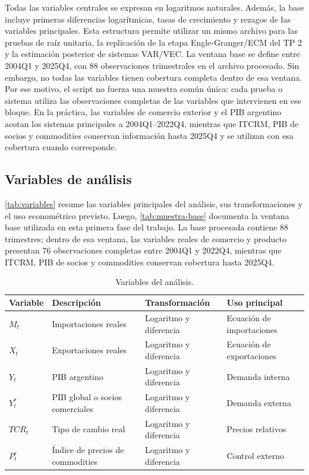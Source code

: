 \documentclass[11pt,a4paper]{article}
\begin{document}
	Todas las variables centrales se expresan en logaritmos naturales. Además, la
	base incluye primeras diferencias logarítmicas, tasas de crecimiento y rezagos
	de las variables principales. Esta estructura permite utilizar un mismo archivo
	para las pruebas de raíz unitaria, la replicación de la etapa Engle-Granger/ECM
	del TP 2 y la estimación posterior de sistemas VAR/VEC. La ventana base se
	define entre 2004Q1 y 2025Q4, con 88 observaciones trimestrales en el archivo
	procesado. Sin embargo, no todas las variables tienen cobertura completa dentro
	de esa ventana. Por ese motivo, el script no fuerza una muestra común única:
	cada prueba o sistema utiliza las observaciones completas de las variables que
	intervienen en ese bloque. En la práctica, las variables de comercio exterior y
	el PIB argentino acotan los sistemas principales a 2004Q1--2022Q4, mientras que
	ITCRM, PIB de socios y commodities conservan información hasta 2025Q4 y se
	utilizan con esa cobertura cuando corresponde.

	\subsection{Variables de análisis}
	\label{subsec:datos-variables}

	\autoref{tab:variables} resume las variables principales del análisis, sus
	transformaciones y el uso econométrico previsto. Luego,
	\autoref{tab:muestra-base} documenta la ventana base utilizada en esta primera
	fase del trabajo. La base procesada contiene 88 trimestres; dentro de esa
	ventana, las variables reales de comercio y producto presentan 76 observaciones
	completas entre 2004Q1 y 2022Q4, mientras que ITCRM, PIB de socios y commodities
	conservan cobertura hasta 2025Q4.

	\begin{table}[H]
		\centering
		\caption{Variables del análisis.}
		\label{tab:variables}
		\small
		\begin{tabular}{p{3.2cm}p{4.5cm}p{3.2cm}p{3.2cm}}
			\toprule
			Variable & Descripción & Transformación & Uso principal \\
			\midrule
			$M_t$ & Importaciones reales & Logaritmo y diferencia & Ecuación de importaciones \\
			$X_t$ & Exportaciones reales & Logaritmo y diferencia & Ecuación de exportaciones \\
			$Y_t$ & PIB argentino & Logaritmo y diferencia & Demanda interna \\
			$Y_t^*$ & PIB global o socios comerciales & Logaritmo y diferencia & Demanda externa \\
			$TCR_t$ & Tipo de cambio real & Logaritmo y diferencia & Precios relativos \\
			$P_t^c$ & Índice de precios de commodities & Logaritmo y diferencia & Control externo \\
			\bottomrule
		\end{tabular}
	\end{table}
\end{document}

